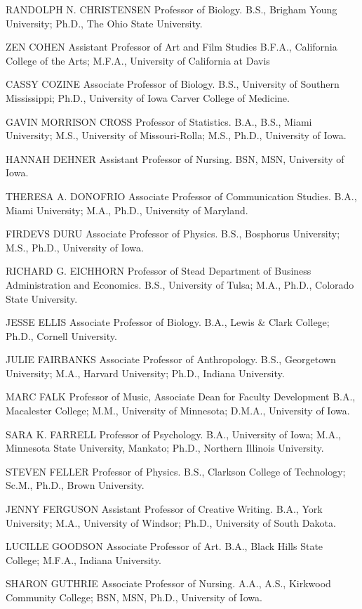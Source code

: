 \documentclass[
  letterpaper,
]{scrbook}
\begin{document}
RANDOLPH N. CHRISTENSEN Professor of Biology. B.S., Brigham Young
University; Ph.D., The Ohio State University.

ZEN COHEN Assistant Professor of Art and Film Studies B.F.A., California
College of the Arts; M.F.A., University of California at Davis

CASSY COZINE Associate Professor of Biology. B.S., University of
Southern Mississippi; Ph.D., University of Iowa Carver College of
Medicine.

GAVIN MORRISON CROSS Professor of Statistics. B.A., B.S., Miami
University; M.S., University of Missouri-Rolla; M.S., Ph.D., University
of Iowa.

HANNAH DEHNER Assistant Professor of Nursing. BSN, MSN, University of
Iowa.

THERESA A. DONOFRIO Associate Professor of Communication Studies. B.A.,
Miami University; M.A., Ph.D., University of Maryland.

FIRDEVS DURU Associate Professor of Physics. B.S., Bosphorus University;
M.S., Ph.D., University of Iowa.

RICHARD G. EICHHORN Professor of Stead Department of Business
Administration and Economics. B.S., University of Tulsa; M.A., Ph.D.,
Colorado State University.

JESSE ELLIS Associate Professor of Biology. B.A., Lewis \& Clark
College; Ph.D., Cornell University.

JULIE FAIRBANKS Associate Professor of Anthropology. B.S., Georgetown
University; M.A., Harvard University; Ph.D., Indiana University.

MARC FALK Professor of Music, Associate Dean for Faculty Development
B.A., Macalester College; M.M., University of Minnesota; D.M.A.,
University of Iowa.

SARA K. FARRELL Professor of Psychology. B.A., University of Iowa; M.A.,
Minnesota State University, Mankato; Ph.D., Northern Illinois
University.

STEVEN FELLER Professor of Physics. B.S., Clarkson College of
Technology; Sc.M., Ph.D., Brown University.

JENNY FERGUSON Assistant Professor of Creative Writing. B.A., York
University; M.A., University of Windsor; Ph.D., University of South
Dakota.

LUCILLE GOODSON Associate Professor of Art. B.A., Black Hills State
College; M.F.A., Indiana University.

SHARON GUTHRIE Associate Professor of Nursing. A.A., A.S., Kirkwood
Community College; BSN, MSN, Ph.D., University of Iowa.
\end{document}
